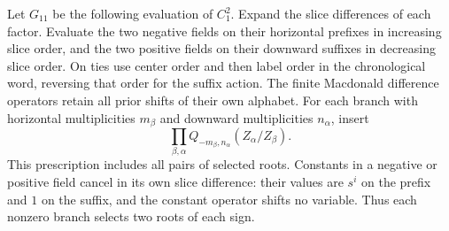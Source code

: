 Let $G_{11}$ be the following evaluation of $C_1^2$. Expand the slice
differences of each factor. Evaluate the two negative fields on their
horizontal prefixes in increasing slice order, and the two positive fields
on their downward suffixes in decreasing slice order. On ties use center
order and then label order in the chronological word, reversing that order
for the suffix action. The finite Macdonald difference operators retain all
prior shifts of their own alphabet. For each branch with horizontal
multiplicities $m_\beta$ and downward multiplicities $n_\alpha$, insert
\[
                 \prod_{\beta,\alpha}
                 Q_{-m_\beta,n_\alpha}(Z_\alpha/Z_\beta).
\]
This prescription includes all pairs of selected roots. Constants in a
negative or positive field cancel in its own slice difference: their
values are $s^i$ on the prefix and $1$ on the suffix, and the constant
operator shifts no variable. Thus each nonzero branch selects two roots
of each sign.


